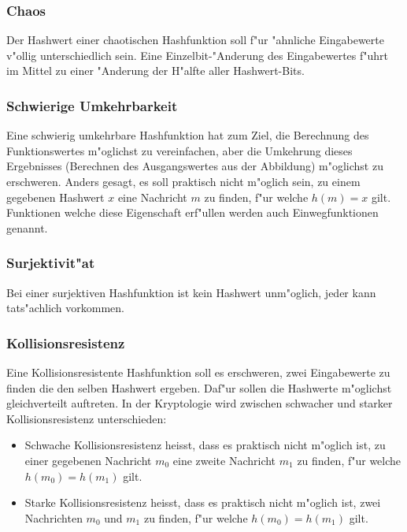 \begin{refsection}
\subsubsection{Chaos}

Der Hashwert einer chaotischen Hashfunktion soll f"ur "ahnliche Eingabewerte
v"ollig unterschiedlich sein. Eine Einzelbit-"Anderung des Eingabewertes f"uhrt
im Mittel zu einer "Anderung der H"alfte aller Hashwert-Bits.

\subsubsection{Schwierige Umkehrbarkeit}

Eine schwierig umkehrbare Hashfunktion hat zum Ziel, die Berechnung des
Funktionswertes m"oglichst zu vereinfachen, aber die Umkehrung dieses Ergebnisses
(Berechnen des Ausgangswertes aus der Abbildung) m"oglichst zu erschweren. Anders
gesagt, es soll praktisch nicht m"oglich sein, zu einem gegebenen Hashwert $x$
eine Nachricht $m$ zu finden, f"ur welche $h(m) = x$ gilt.  Funktionen welche
diese Eigenschaft erf"ullen werden auch Einwegfunktionen genannt.

\subsubsection{Surjektivit"at}

Bei einer surjektiven Hashfunktion ist kein Hashwert unm"oglich, jeder kann
tats"achlich vorkommen.

\subsubsection{Kollisionsresistenz}
\label{crypto:kollisionsresistenz}

Eine Kollisionsresistente Hashfunktion soll es erschweren, zwei Eingabewerte zu
finden die den selben Hashwert ergeben. Daf"ur sollen die Hashwerte m"oglichst
gleichverteilt auftreten. In der Kryptologie wird zwischen schwacher und starker
Kollisionsresistenz unterschieden\cite{crypto:stephan2011kryptographie}:

\begin{itemize}
		\item Schwache Kollisionsresistenz heisst, dass es praktisch nicht m"oglich
			ist, zu einer gegebenen Nachricht $m_0$ eine zweite Nachricht $m_1$ zu finden, f"ur
			welche $h(m_0) = h(m_1)$ gilt.
		\item Starke Kollisionsresistenz heisst, dass es praktisch nicht m"oglich
			ist, zwei Nachrichten $m_0$ und $m_1$ zu finden, f"ur welche $h(m_0) =
			h(m_1)$ gilt.
\end{itemize}


\end{refsection}
